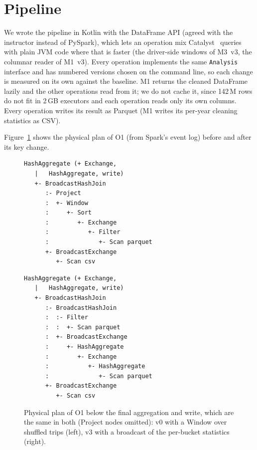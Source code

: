 \documentclass[sigconf]{acmart}
\begin{document}
\section{Pipeline}
We wrote the pipeline in Kotlin with the DataFrame API (agreed with the instructor instead of PySpark), which lets an operation
mix Catalyst~\cite{sparksql} queries with plain JVM code where that is faster (the driver-side windows of M3~v3, the columnar
reader of M1~v3). Every operation implements the same \texttt{Analysis} interface and has numbered versions chosen on the command
line, so each change is measured on its own against the baseline. M1 returns the cleaned DataFrame lazily and the other operations
read from it; we do not cache it, since 142\,M rows do not fit in 2\,GB executors and each operation reads only its own columns.
Every operation writes its result as Parquet (M1 writes its per-year cleaning statistics as CSV).

Figure~\ref{fig:plan} shows the physical plan of O1 (from Spark's event log) before and after its key change.

\begin{figure}[t]
\centering\tiny
\begin{minipage}[t]{0.47\columnwidth}
\begin{verbatim}
HashAggregate (+ Exchange,
   |   HashAggregate, write)
   +- BroadcastHashJoin
      :- Project
      :  +- Window
      :     +- Sort
      :        +- Exchange
      :           +- Filter
      :              +- Scan parquet
      +- BroadcastExchange
         +- Scan csv
\end{verbatim}
\end{minipage}\hfill
\begin{minipage}[t]{0.50\columnwidth}
\begin{verbatim}
HashAggregate (+ Exchange,
   |   HashAggregate, write)
   +- BroadcastHashJoin
      :- BroadcastHashJoin
      :  :- Filter
      :  :  +- Scan parquet
      :  +- BroadcastExchange
      :     +- HashAggregate
      :        +- Exchange
      :           +- HashAggregate
      :              +- Scan parquet
      +- BroadcastExchange
         +- Scan csv
\end{verbatim}
\end{minipage}
\caption{Physical plan of O1 below the final aggregation and write, which are the same in both (Project nodes omitted): v0 with a Window over shuffled trips (left), v3 with a broadcast of
the per-bucket statistics (right).}
\label{fig:plan}
\end{figure}
\end{document}
